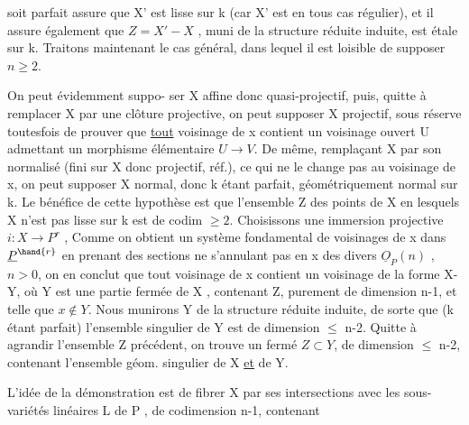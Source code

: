 
 soit parfait assure que X' est lisse sur k (car X' est en tous cas
régulier), et il assure également que $Z = X' - X$ , muni de la structure
réduite induite, est étale sur k. Traitons maintenant le cas général,
dans lequel il est loisible de supposer $n \geqslant 2$.

 On peut évidemment suppo-%
ser X  affine donc quasi-projectif, puis, quitte à remplacer X
par une clôture projective, on peut supposer X projectif, sous réserve
toutesfois de prouver que \uline{tout} voisinage de x contient un voisinage
ouvert U admettant un morphisme élémentaire $U \to V$. De même, remplaçant
X par son normalisé (fini sur X donc projectif, réf.), ce qui ne le
change pas au voisinage de x, on peut supposer X normal, donc k étant
parfait, géométriquement normal sur k.  Le
bénéfice de cette hypothèse est que l'ensemble Z des points de X en
lesquels X n'est pas lisse sur k est de codim $\geqslant 2$. 
Choisissons une immersion projective $i : X \longrightarrow P^r$ , 
 Comme on obtient un système
fondamental de voisinages de x dans $\underline{P}^{\hand{r}}$ en prenant des sections ne
s'annulant pas en x des divers $\underline{O}_P(n)$ , $n > 0$, on en conclut que tout
voisinage de x contient un voisinage de la forme X-Y, où Y est une
partie fermée de X , contenant Z, purement de dimension n-1, et telle que
$x \notin Y$. Nous munirons Y de la structure réduite induite, de sorte que
(k étant parfait) l'ensemble singulier de Y est de dimension $\leqslant$ n-2. 
Quitte à agrandir l'ensemble Z précédent, on trouve un fermé $Z \subset Y$, de
dimension $\leqslant$ n-2, contenant l'ensemble géom. singulier de X \uline{et} de Y.

L'idée de la démonstration est de fibrer X par ses intersections
avec les sous-variétés linéaires L de P , de codimension n-1, contenant

